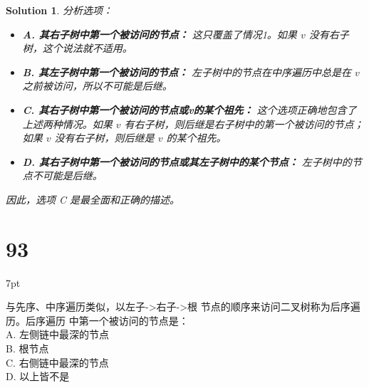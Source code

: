 \documentclass[UTF8]{report}
\newtheorem{solution}{Solution}
\theoremstyle{MyLineTheoremStyle} %
\theoremstyle{MyBlockTheoremStyle} %
\theoremstyle{MySubsubsectionStyle} %
\newenvironment{graybox}{%
        \def\FrameCommand{%
        \hspace{1pt}%
        {\color{gray}\small \vrule width 2pt}%
        {\color{graybox_color}\vrule width 4pt}%
        \colorbox{graybox_color}%
        }%
        \MakeFramed{\advance\hsize-\width\FrameRestore}%
        \noindent\hspace{-4.55pt}%
        \begin{adjustwidth}{}{7pt}%
        \vspace{2pt}\vspace{2pt}%
        }
        {%
        \vspace{2pt}\end{adjustwidth}\endMakeFramed%
        }
\begin{document}
\begin{solution}
分析选项：
\begin{itemize}
    \item \textbf{A. 其右子树中第一个被访问的节点：} 这只覆盖了情况1。如果 $v$ 没有右子树，这个说法就不适用。
    \item \textbf{B. 其左子树中第一个被访问的节点：} 左子树中的节点在中序遍历中总是在 $v$ 之前被访问，所以不可能是后继。
    \item \textbf{C. 其右子树中第一个被访问的节点或v的某个祖先：} 这个选项正确地包含了上述两种情况。如果 $v$ 有右子树，则后继是右子树中的第一个被访问的节点；如果 $v$ 没有右子树，则后继是 $v$ 的某个祖先。
    \item \textbf{D. 其右子树中第一个被访问的节点或其左子树中的某个节点：} 左子树中的节点不可能是后继。
\end{itemize}

因此，选项 C 是最全面和正确的描述。
\end{solution}


\section*{93}
\begin{graybox}
与先序、中序遍历类似，以左子->右子->根
节点的顺序来访问二叉树称为后序遍历。后序遍历
中第一个被访问的节点是： \\
A. 左侧链中最深的节点 \\
B. 根节点 \\
C. 右侧链中最深的节点 \\
D. 以上皆不是
\end{graybox}
\end{document}
